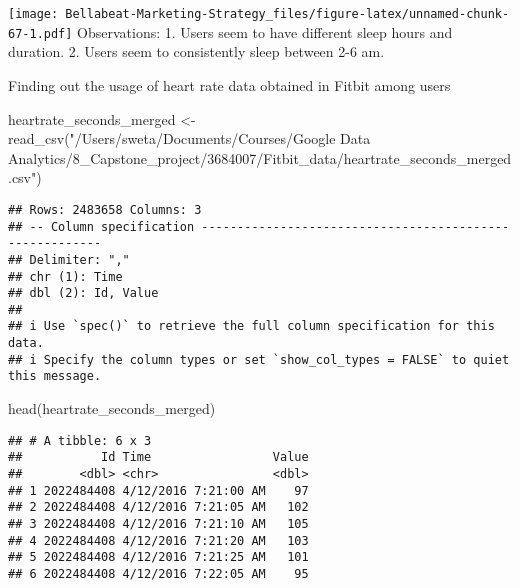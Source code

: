 \documentclass[
]{article}
\newenvironment{Shaded}{\begin{snugshade}}{\end{snugshade}}
\newcommand{\AttributeTok}[1]{\textcolor[rgb]{0.77,0.63,0.00}{#1}}
\newcommand{\FunctionTok}[1]{\textcolor[rgb]{0.00,0.00,0.00}{#1}}
\newcommand{\NormalTok}[1]{#1}
\newcommand{\OtherTok}[1]{\textcolor[rgb]{0.56,0.35,0.01}{#1}}
\newcommand{\SpecialCharTok}[1]{\textcolor[rgb]{0.00,0.00,0.00}{#1}}
\newcommand{\StringTok}[1]{\textcolor[rgb]{0.31,0.60,0.02}{#1}}
\begin{document}
\texttt{[image: Bellabeat-Marketing-Strategy\_files/figure-latex/unnamed-chunk-67-1.pdf]}
Observations: 1. Users seem to have different sleep hours and duration.
2. Users seem to consistently sleep between 2-6 am.

Finding out the usage of heart rate data obtained in Fitbit among users

\begin{Shaded}
\begin{Highlighting}[]
\NormalTok{heartrate\_seconds\_merged }\OtherTok{\textless{}{-}} \FunctionTok{read\_csv}\NormalTok{(}\StringTok{"/Users/sweta/Documents/Courses/Google Data Analytics/8\_Capstone\_project/3684007/Fitbit\_data/heartrate\_seconds\_merged.csv"}\NormalTok{)}
\end{Highlighting}
\end{Shaded}

\begin{verbatim}
## Rows: 2483658 Columns: 3
## -- Column specification --------------------------------------------------------
## Delimiter: ","
## chr (1): Time
## dbl (2): Id, Value
## 
## i Use `spec()` to retrieve the full column specification for this data.
## i Specify the column types or set `show_col_types = FALSE` to quiet this message.
\end{verbatim}

\begin{Shaded}
\begin{Highlighting}[]
\FunctionTok{head}\NormalTok{(heartrate\_seconds\_merged)}
\end{Highlighting}
\end{Shaded}

\begin{verbatim}
## # A tibble: 6 x 3
##           Id Time                 Value
##        <dbl> <chr>                <dbl>
## 1 2022484408 4/12/2016 7:21:00 AM    97
## 2 2022484408 4/12/2016 7:21:05 AM   102
## 3 2022484408 4/12/2016 7:21:10 AM   105
## 4 2022484408 4/12/2016 7:21:20 AM   103
## 5 2022484408 4/12/2016 7:21:25 AM   101
## 6 2022484408 4/12/2016 7:22:05 AM    95
\end{verbatim}

\begin{Shaded}
\end{Shaded}
\end{document}
